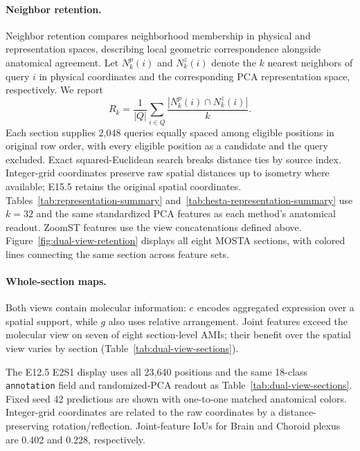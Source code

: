 \begin{table}[!htbp]
\centering\small
\caption{\textbf{Joint AMI on every held-out section and granularity.} Each value averages the three downstream clustering runs; bold marks the higher unrounded value within each section--granularity pair.}
\label{tab:cross-granularity-ami-sections}
\setlength{\tabcolsep}{4pt}
\renewcommand{\arraystretch}{1.08}

\end{table}

\paragraph{Neighbor retention.}
Neighbor retention compares neighborhood membership in physical and representation spaces, describing local geometric correspondence alongside anatomical agreement.
Let $N_k^p(i)$ and $N_k^z(i)$ denote the $k$ nearest neighbors of query $i$ in physical coordinates and the corresponding PCA representation space, respectively. We report
\begin{equation}
R_k=\frac{1}{|Q|}\sum_{i\in Q}\frac{|N_k^p(i)\cap N_k^z(i)|}{k}.
\end{equation}
Each section supplies 2,048 queries equally spaced among eligible positions in original row order, with every eligible position as a candidate and the query excluded. Exact squared-Euclidean search breaks distance ties by source index. Integer-grid coordinates preserve raw spatial distances up to isometry where available; E15.5 retains the original spatial coordinates. Tables~\ref{tab:representation-summary} and~\ref{tab:hesta-representation-summary} use $k=32$ and the same standardized PCA features as each method's anatomical readout. ZoomST features use the view concatenations defined above. Figure~\ref{fig:dual-view-retention} displays all eight MOSTA sections, with colored lines connecting the same section across feature sets.

\paragraph{Whole-section maps.}
Both views contain molecular information: $e$ encodes aggregated expression over a spatial support, while $g$ also uses relative arrangement. Joint features exceed the molecular view on seven of eight section-level AMIs; their benefit over the spatial view varies by section (Table~\ref{tab:dual-view-sections}).

The E12.5 E2S1 display uses all 23,640 positions and the same 18-class \texttt{annotation} field and randomized-PCA readout as Table~\ref{tab:dual-view-sections}. Fixed seed 42 predictions are shown with one-to-one matched anatomical colors. Integer-grid coordinates are related to the raw coordinates by a distance-preserving rotation/reflection. Joint-feature IoUs for Brain and Choroid plexus are 0.402 and 0.228, respectively.

